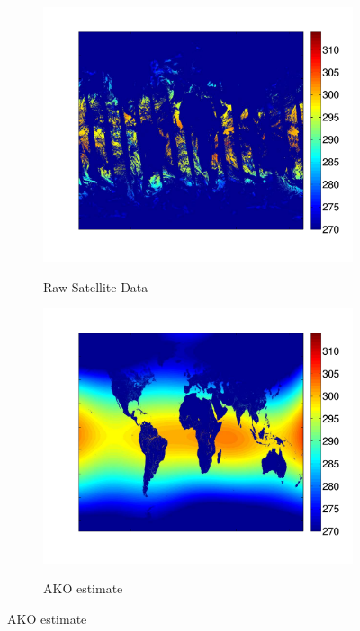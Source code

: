 \documentclass[letterpaper,12pt,peerreviewca,draftcls]{IEEEtran}
\begin{document}
\begin{figure}
	\centering
	\captionsetup[subfigure]{aboveskip = -12pt}
	\begin{subfigure}[t]{0.41\textwidth}
		\includegraphics[width=\linewidth]{"Figure 13a"}
		\label{fig:Rawpathfinder}
		\caption{Raw Satellite Data}
	\end{subfigure}
	\begin{subfigure}[t]{0.41\textwidth}
		\includegraphics[width=\linewidth]{"Figure 13b"}
		\label{fig:pathfinder}
		\caption{AKO estimate}
	\end{subfigure}

\end{figure}
\end{document}
